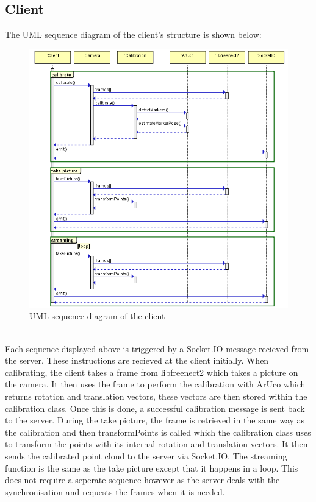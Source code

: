 \documentclass{article}
\begin{document}
\subsection{Client}
The UML sequence diagram of the client's structure is shown below:
\begin{figure}[h]
  \centering
  \includegraphics[scale=0.6]{clientUML}
  \caption{UML sequence diagram of the client}
\end{figure}
\\
Each sequence displayed above is triggered by a Socket.IO message recieved from the server. These instructions are recieved at the client initially. When calibrating, the client takes a frame from libfreenect2 which takes a picture on the camera. It then uses the frame to perform the calibration with ArUco which returns rotation and translation vectors, these vectors are then stored within the calibration class. Once this is done, a successful calibration message is sent back to the server. During the take picture, the frame is retrieved in the same way as the calibration and then transformPoints is called which the calibration class uses to transform the points with its internal rotation and translation vectors. It then sends the calibrated point cloud to the server via Socket.IO. The streaming function is the same as the take picture except that it happens in a loop. This does not require a seperate sequence however as the server deals with the synchronisation and requests the frames when it is needed.
\end{document}
